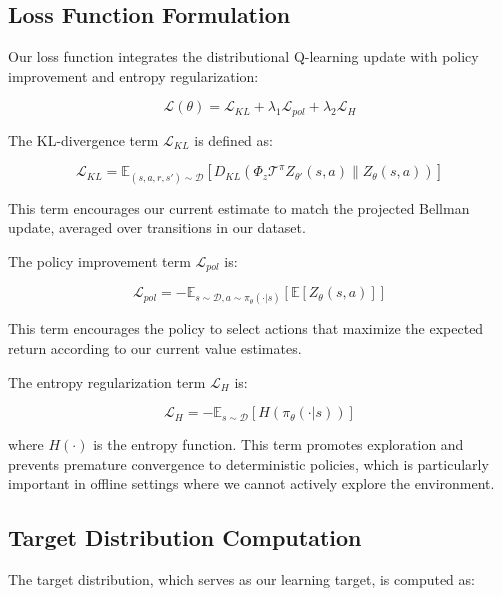 \documentclass[12pt]{article}
\begin{document}
\subsection{Loss Function Formulation}

Our loss function integrates the distributional Q-learning update with policy improvement and entropy regularization:

\begin{equation}
\mathcal{L}(\theta) = \mathcal{L}_{KL} + \lambda_1 \mathcal{L}_{pol} + \lambda_2 \mathcal{L}_{H}
\end{equation}

The KL-divergence term $\mathcal{L}_{KL}$ is defined as:

\begin{equation}
\mathcal{L}_{KL} = \mathbb{E}_{(s,a,r,s') \sim \mathcal{D}}[D_{KL}(\Phi_z \mathcal{T}^\pi Z_{\theta'}(s, a) \| Z_\theta(s, a))]
\end{equation}

This term encourages our current estimate to match the projected Bellman update, averaged over transitions in our dataset.

The policy improvement term $\mathcal{L}_{pol}$ is:

\begin{equation}
\mathcal{L}_{pol} = -\mathbb{E}_{s \sim \mathcal{D}, a \sim \pi_\theta(\cdot|s)}[\mathbb{E}[Z_\theta(s,a)]]
\end{equation}

This term encourages the policy to select actions that maximize the expected return according to our current value estimates.

The entropy regularization term $\mathcal{L}_{H}$ is:

\begin{equation}
\mathcal{L}_{H} = -\mathbb{E}_{s \sim \mathcal{D}}[H(\pi_\theta(\cdot|s))]
\end{equation}

where $H(\cdot)$ is the entropy function. This term promotes exploration and prevents premature convergence to deterministic policies, which is particularly important in offline settings where we cannot actively explore the environment.

\subsection{Target Distribution Computation}

The target distribution, which serves as our learning target, is computed as:
\end{document}
